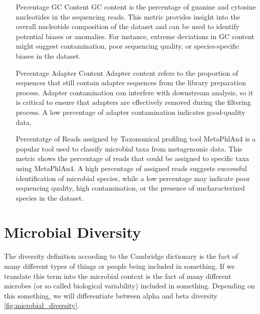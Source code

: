 \begin{itemize}
    \item[Percentage GC Content] GC content is the percentage of guanine and cytosine nucleotides in the sequencing reads. 
    This metric provides insight into the overall nucleotide composition of the dataset and can be used to identify 
    potential biases or anomalies. For instance, extreme deviations in GC content might suggest contamination, poor 
    sequencing quality, or species-specific biases in the dataset.
    \item[Percentage Adapter Content] Adapter content refers to the proportion of sequences that still contain adapter 
    sequences from the library preparation process. Adapter contamination can interfere with downstream analysis, so it 
    is critical to ensure that adapters are effectively removed during the filtering process. A low percentage of adapter 
    contamination indicates good-quality data.
    \item[Percentatge of Reads assigned by Taxonomical profiling tool] MetaPhlAn4 is a popular tool used to classify 
    microbial taxa from metagenomic data. This metric shows the percentage of reads that could be assigned to specific 
    taxa using MetaPhlAn4. A high percentage of assigned reads suggests successful identification of microbial species, 
    while a low percentage may indicate poor sequencing quality, high contamination, or the presence of uncharacterized 
    species in the dataset.
\end{itemize}

\section{Microbial Diversity}
The diversity definition according to the Cambridge dictionary is the fact of many different types of things or people being included 
in something. If we translate this term into the microbial context is the fact of many different microbes (or so called 
biological variability) included in something. Depending on this something, we will differentiate between alpha and beta
diversity \autoref{fig:microbial_diversity}.

